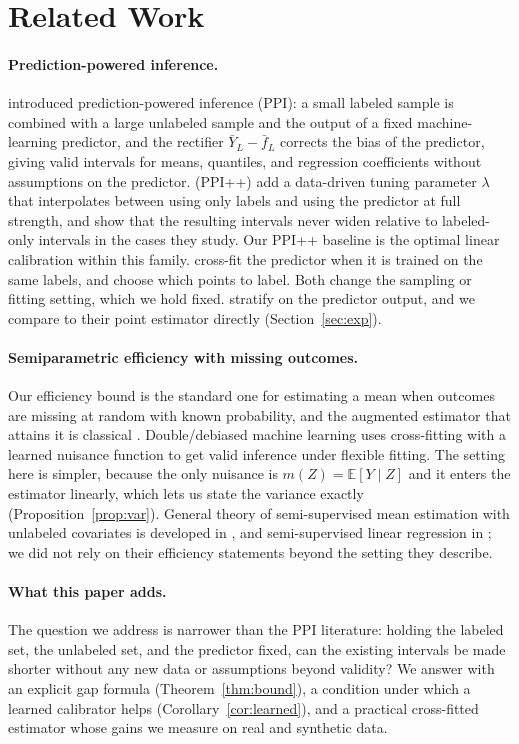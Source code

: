 \section{Related Work}
\label{sec:related}

\paragraph{Prediction-powered inference.}
\citet{angelopoulos2023ppi} introduced prediction-powered inference (PPI): a small labeled sample is combined with a large unlabeled sample and the output of a fixed machine-learning predictor, and the rectifier $\bar Y_L-\bar f_L$ corrects the bias of the predictor, giving valid intervals for means, quantiles, and regression coefficients without assumptions on the predictor. \citet{angelopoulos2023ppiplus} (PPI++) add a data-driven tuning parameter $\lambda$ that interpolates between using only labels and using the predictor at full strength, and show that the resulting intervals never widen relative to labeled-only intervals in the cases they study. Our PPI++ baseline is the optimal linear calibration within this family. \citet{zrnic2023cross} cross-fit the predictor when it is trained on the same labels, and \citet{zrnic2024active} choose which points to label. Both change the sampling or fitting setting, which we hold fixed. \citet{fisch2024strat} stratify on the predictor output, and we compare to their point estimator directly (Section~\ref{sec:exp}).

\paragraph{Semiparametric efficiency with missing outcomes.}
Our efficiency bound is the standard one for estimating a mean when outcomes are missing at random with known probability, and the augmented estimator that attains it is classical \citep{robins1994estimation,tsiatis2006semiparametric}. Double/debiased machine learning \citep{chernozhukov2016dml} uses cross-fitting with a learned nuisance function to get valid inference under flexible fitting. The setting here is simpler, because the only nuisance is $m(Z)=\mathbb E[Y\mid Z]$ and it enters the estimator linearly, which lets us state the variance exactly (Proposition~\ref{prop:var}). General theory of semi-supervised mean estimation with unlabeled covariates is developed in \citet{zhang2019semi}, and semi-supervised linear regression in \citet{chakrabortty2018efficient}; we did not rely on their efficiency statements beyond the setting they describe.

\paragraph{What this paper adds.}
The question we address is narrower than the PPI literature: holding the labeled set, the unlabeled set, and the predictor fixed, can the existing intervals be made shorter without any new data or assumptions beyond validity? We answer with an explicit gap formula (Theorem~\ref{thm:bound}), a condition under which a learned calibrator helps (Corollary~\ref{cor:learned}), and a practical cross-fitted estimator whose gains we measure on real and synthetic data.
